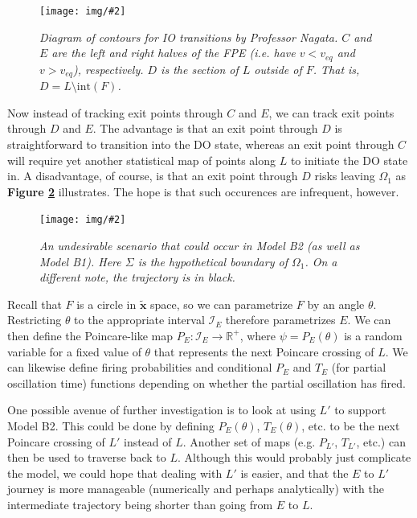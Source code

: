 \documentclass[letterpaper,12pt]{article}
\numberwithin{table}{section}
\numberwithin{figure}{section}
\numberwithin{equation}{section}
\newcommand{\centerfig}[2]{\begin{center}\texttt{[image: img/\#2]}\end{center}}
\newcommand{\ccaption}[1]{\caption{\textit{#1}}}
\newcommand{\reffig}[1]{\textbf{Figure \ref{#1}}}
\begin{document}
\begin{flushleft}
\begin{figure}[h]
        \centering
 
        \centerfig{0.6}{fpe-dissect.jpg}
    
        \captionsetup{width=0.9\linewidth}
        \ccaption{Diagram of contours for IO transitions by Professor Nagata. $C$ and $E$ are the left and right halves of the FPE (i.e. have $v < v_{eq}$ and $v > v_{eq}$), respectively. $D$ is the section of $L$ outside of $F$. That is, $D = L \setminus \text{int}(F)$.}
        \label{fig:fpe-dissect}
    
    \end{figure}
    
    Now instead of tracking exit points through $C$ and $E$, we can track exit points through $D$ and $E$. The advantage is that an exit point through $D$ is straightforward to transition into the DO state, whereas an exit point through $C$ will require yet another statistical map of points along $L$ to initiate the DO state in. A disadvantage, of course, is that an exit point through $D$ risks leaving $\Omega_1$ as \reffig{fig:modelb2-fpe-fail} illustrates. The hope is that such occurences are infrequent, however.
    \begin{figure}[h]

        \centering
 
        \centerfig{0.8}{modelb2-fpe-fail.jpg}
    
        \captionsetup{width=0.8\linewidth}
        \ccaption{An undesirable scenario that could occur in Model B2 (as well as Model B1). Here $\Sigma$ is the hypothetical boundary of $\Omega_1$. On a different note, the trajectory is in black.}
        \label{fig:modelb2-fpe-fail}
    
    \end{figure}

    Recall that $F$ is a circle in $\tilde{\mathbf{x}}$ space, so we can parametrize $F$ by an angle $\theta$. Restricting $\theta$ to the appropriate interval $\mathcal{I}_E$ therefore parametrizes $E$. We can then define the Poincare-like map $P_E : \mathcal{I}_E \to \mathbb{R}^+$, where $\psi = P_E(\theta)$ is a random variable for a fixed value of $\theta$ that represents the next Poincare crossing of $L$. We can likewise define firing probabilities and conditional $P_E$ and $T_E$ (for partial oscillation time) functions depending on whether the partial oscillation has fired.

    One possible avenue of further investigation is to look at using $L'$ to support Model B2. This could be done by defining $P_E(\theta)$, $T_E(\theta)$, etc. to be the next Poincare crossing of $L'$ instead of $L$. Another set of maps (e.g. $P_{L'}$, $T_{L'}$, etc.) can then be used to traverse back to $L$. Although this would probably just complicate the model, we could hope that dealing with $L'$ is easier, and that the $E$ to $L'$ journey is more manageable (numerically and perhaps analytically) with the intermediate trajectory being shorter than going from $E$ to $L$.


\end{flushleft}
\end{document}
